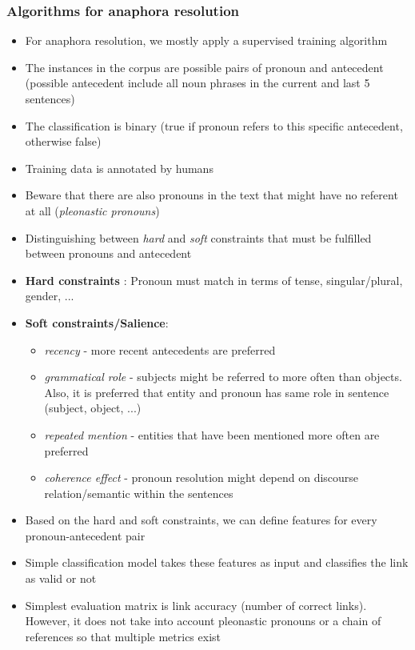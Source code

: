 \subsubsection{Algorithms for anaphora resolution}
\begin{itemize}
	\item For anaphora resolution, we mostly apply a supervised training algorithm
	\item The instances in the corpus are possible pairs of pronoun and antecedent (possible antecedent include all noun phrases in the current and last 5 sentences)
	\item The classification is binary (true if pronoun refers to this specific antecedent, otherwise false)
	\item Training data is annotated by humans
	\item Beware that there are also pronouns in the text that might have no referent at all (\textit{pleonastic pronouns})
	\item Distinguishing between \textit{hard} and \textit{soft} constraints that must be fulfilled between pronouns and antecedent
	\item \textbf{Hard constraints} : Pronoun must match in terms of tense, singular/plural, gender, ...
	\item \textbf{Soft constraints/Salience}: 
	\begin{itemize}
		\item \textit{recency} -  more recent antecedents are preferred
		\item \textit{grammatical role} - subjects might be referred to more often than objects. Also, it is preferred that entity and pronoun has same role in sentence (subject, object, ...)
		\item \textit{repeated mention} - entities that have been mentioned more often are preferred
		\item \textit{coherence effect} - pronoun resolution might depend on discourse relation/semantic within the sentences
	\end{itemize}
	\item Based on the hard and soft constraints, we can define features for every pronoun-antecedent pair
	\item Simple classification model takes these features as input and classifies the link as valid or not
	\item Simplest evaluation matrix is link accuracy (number of correct links). However, it does not take into account pleonastic pronouns or a chain of references so that multiple metrics exist
\end{itemize}